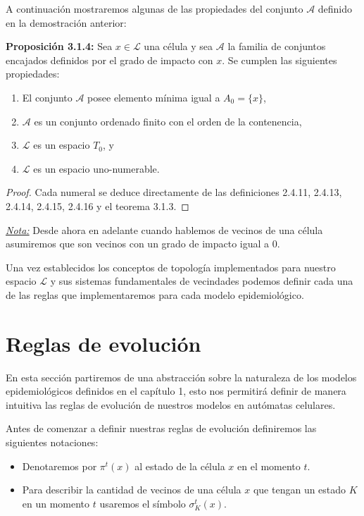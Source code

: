 A continuación mostraremos algunas de las propiedades del conjunto $\mathcal{A}$ definido en la demostración anterior:

\textbf{Proposición 3.1.4:} Sea $x\in\mathcal{L}$ una célula y sea $\mathcal{A}$ la familia de conjuntos encajados definidos por el grado de impacto con $x$. Se cumplen las siguientes propiedades:

\begin{enumerate}
    \item El conjunto $\mathcal{A}$ posee elemento mínima igual a $A_0=\{x\}$,
    \item $\mathcal{A}$ es un conjunto ordenado finito con el orden de la contenencia,
    \item $\mathcal{L}$ es un espacio $T_0$, y
    \item $\mathcal{L}$ es un espacio uno-numerable.
\end{enumerate}

\begin{proof}
Cada numeral se deduce directamente de las definiciones 2.4.11, 2.4.13, 2.4.14, 2.4.15, 2.4.16 y el teorema 3.1.3.
\end{proof}

\underline{\textit{Nota:}} Desde ahora en adelante cuando hablemos de vecinos de una célula asumiremos que son vecinos con un grado de impacto igual a 0.

Una vez establecidos los conceptos de topología implementados para nuestro espacio $\mathcal{L}$ y sus sistemas fundamentales de vecindades podemos definir cada una de las reglas que implementaremos para cada modelo epidemiológico.

\section{Reglas de evolución}

En esta sección partiremos de una abstracción sobre la naturaleza de los modelos epidemiológicos definidos en el capítulo 1, esto nos permitirá definir de manera intuitiva las reglas de evolución de nuestros modelos en autómatas celulares.

Antes de comenzar a definir nuestras reglas de evolución definiremos las siguientes notaciones:
\begin{itemize}
    \item Denotaremos por $\pi^t(x)$ al estado de la célula $x$ en el momento $t$.
    \item Para describir la cantidad de vecinos de una célula $x$ que tengan un estado $K$ en un momento $t$ usaremos el símbolo $\sigma_K^t(x)$.
\end{itemize}

